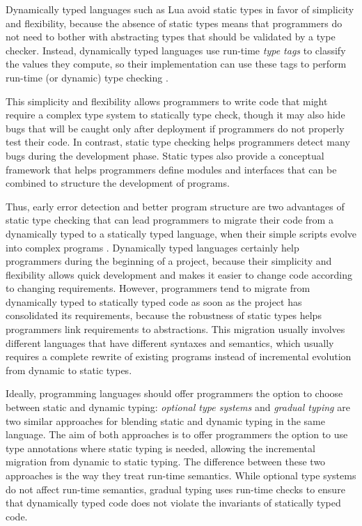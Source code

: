 Dynamically typed languages such as Lua avoid static types in favor of
simplicity and flexibility, because the absence of static types means
that programmers do not need to bother with abstracting types that
should be validated by a type checker.
Instead, dynamically typed languages use run-time \emph{type tags}
to classify the values they compute, so their implementation can use
these tags to perform run-time (or dynamic) type checking
\cite{pierce2002tpl}.

This simplicity and flexibility allows programmers to write code that
might require a complex type system to statically type check,
though it may also hide bugs that will be caught only after deployment
if programmers do not properly test their code.
In contrast, static type checking helps programmers detect many
bugs during the development phase.
Static types also provide a conceptual framework that helps
programmers define modules and interfaces that can be combined to
structure the development of programs.

Thus, early error detection and better program structure are two
advantages of static type checking that can lead programmers to
migrate their code from a dynamically typed to a statically
typed language, when their simple scripts evolve into complex programs
\cite{tobin-hochstadt2006ims}.
Dynamically typed languages certainly help programmers during the
beginning of a project, because their simplicity and flexibility
allows quick development and makes it easier to change code according to
changing requirements.
However, programmers tend to migrate from dynamically typed to
statically typed code as soon as the project has consolidated its
requirements, because the robustness of static types helps
programmers link requirements to abstractions.
This migration usually involves different languages that have
different syntaxes and semantics, which usually requires a complete
rewrite of existing programs instead of incremental evolution from
dynamic to static types.

Ideally, programming languages should offer programmers the
option to choose between static and dynamic typing:
\emph{optional type systems} \cite{bracha2004pluggable} and
\emph{gradual typing} \cite{siek2006gradual} are two similar
approaches for blending static and dynamic typing in the same
language.
The aim of both approaches is to offer programmers the option
to use type annotations where static typing is needed,
allowing the incremental migration from dynamic to static typing.
The difference between these two approaches is the way they treat
run-time semantics.
While optional type systems do not affect run-time semantics,
gradual typing uses run-time checks to ensure that dynamically typed
code does not violate the invariants of statically typed code.

